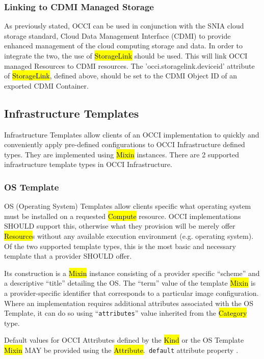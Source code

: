 \documentclass[10pt,a4paper]{article}
\begin{document}
\subsubsection{Linking to CDMI Managed Storage}
As previously stated, OCCI can be used in conjunction with the SNIA
cloud storage standard, Cloud Data Management Interface (CDMI)
\cite{cdmi} to provide enhanced management of the cloud computing
storage and data. In order to integrate the two, the use of
\hl{StorageLink} should be used. This will link OCCI managed Resources
to CDMI resources. The 'occi.storagelink.deviceid' attribute of
\hl{StorageLink}, defined above, should be set to the CDMI Object ID
of an exported CDMI Container.

\subsection{Infrastructure Templates}
Infrastructure Templates allow clients of an OCCI implementation to
quickly and conveniently apply pre-defined configurations to OCCI
Infrastructure defined types. They are implemented using \hl{Mixin}
instances. There are 2 supported infrastructure template types in OCCI
Infrastructure.

\subsubsection{OS Template}
OS (Operating System) Templates allow clients specific what operating
system must be installed on a requested \hl{Compute} resource. OCCI
implementations SHOULD support this, otherwise what they provision
will be merely offer \hl{Resource}s without any available execution
environment (e.g. operating system). Of the two supported template
types, this is the most basic and necessary template that a provider
SHOULD offer.

Its construction is a \hl{Mixin} instance consisting of a provider
specific ``scheme'' and a descriptive ``title'' detailing the OS. The
``term'' value of the template \hl{Mixin} is a provider-specific
identifier that corresponds to a particular image configuration. Where
an implementation requires additional attributes associated with the
OS Template, it can do so using ``{\tt attributes}'' value inherited
from the \hl{Category} type.

Default values for OCCI Attributes defined by the \hl{Kind} or the OS
Template \hl{Mixin} MAY be provided using the \hl{Attribute}.{\tt
  default} attribute property \cite{occi:core}.
\end{document}

